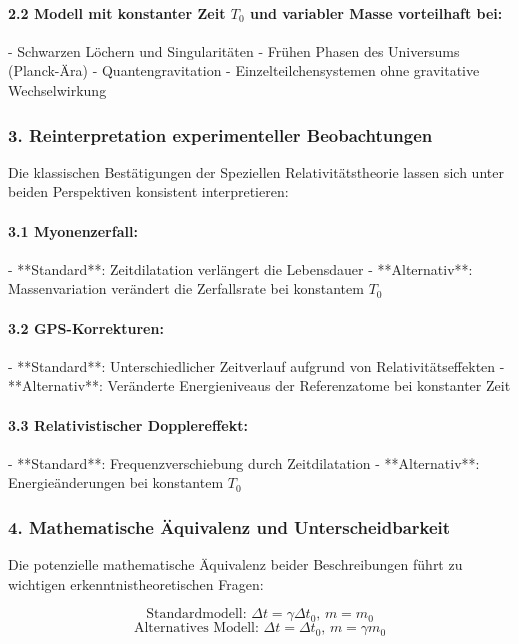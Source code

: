 \documentclass{article}
\begin{document}
	\paragraph{2.2 Modell mit konstanter Zeit \( T_0 \) und variabler Masse vorteilhaft bei:}
	- Schwarzen Löchern und Singularitäten
	- Frühen Phasen des Universums (Planck-Ära)
	- Quantengravitation
	- Einzelteilchensystemen ohne gravitative Wechselwirkung
	
	\subsubsection{3. Reinterpretation experimenteller Beobachtungen}
	
	Die klassischen Bestätigungen der Speziellen Relativitätstheorie lassen sich unter beiden Perspektiven konsistent interpretieren:
	
	\paragraph{3.1 Myonenzerfall:}
	- **Standard**: Zeitdilatation verlängert die Lebensdauer
	- **Alternativ**: Massenvariation verändert die Zerfallsrate bei konstantem \( T_0 \)
	
	\paragraph{3.2 GPS-Korrekturen:}
	- **Standard**: Unterschiedlicher Zeitverlauf aufgrund von Relativitätseffekten
	- **Alternativ**: Veränderte Energieniveaus der Referenzatome bei konstanter Zeit
	
	\paragraph{3.3 Relativistischer Dopplereffekt:}
	- **Standard**: Frequenzverschiebung durch Zeitdilatation
	- **Alternativ**: Energieänderungen bei konstantem \( T_0 \)
	
	\subsubsection{4. Mathematische Äquivalenz und Unterscheidbarkeit}
	
	Die potenzielle mathematische Äquivalenz beider Beschreibungen führt zu wichtigen erkenntnistheoretischen Fragen:
	
	\[
	\text{Standardmodell: } \Delta t = \gamma \Delta t_0, \, m = m_0
	\]
	\[
	\text{Alternatives Modell: } \Delta t = \Delta t_0, \, m = \gamma m_0
	\]
	
\end{document}
